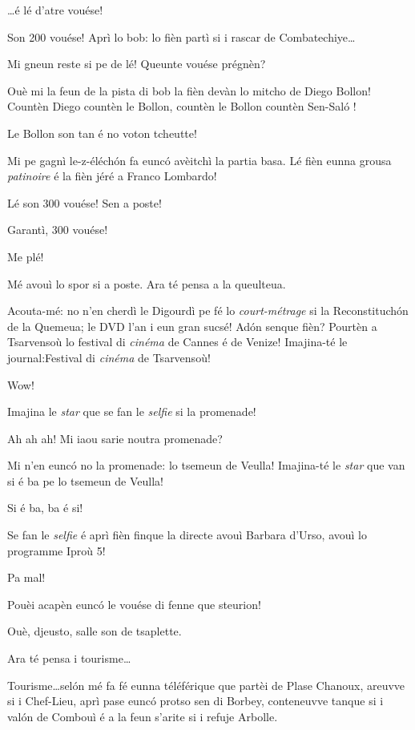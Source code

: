 \begin{drama}
\Ronnyspeaks \ldots é lé d'atre vouése!

\Laurentspeaks Son 200 vouése! Aprì lo bob: lo fièn partì si i rascar de Combatechiye\ldots

\Ronnyspeaks Mi gneun reste si pe de lé! Queunte vouése prégnèn?

\Laurentspeaks Ouè mi la feun de la pista di bob la fièn devàn lo mitcho de Diego Bollon! Countèn Diego countèn le Bollon, countèn le Bollon countèn Sen-Sal\'o !

\Ronnyspeaks Le Bollon son tan é no voton tcheutte!

\Laurentspeaks Mi pe gagnì le-z-éléch\'on fa euncó avèitchì la partia basa. Lé fièn eunna grousa \textit{patinoire} é la fièn jéré a Franco Lombardo!

\Ronnyspeaks Lé son 300 vouése! Sen a poste! 

\Laurentspeaks Garantì,  300 vouése!

\Ronnyspeaks Me plé!

\Laurentspeaks Mé avouì lo spor si a poste. Ara té pensa a la queulteua.

\Ronnyspeaks Acouta-mé: no n'en cherdì le Digourdì pe fé lo \textit{court-métrage} si la Reconstituch\'on de la Quemeua; le DVD l'an i eun gran sucsé! Ad\'on senque fièn? Pourtèn a Tsarvensoù lo festival di \textit{cinéma} de Cannes é de Venize! Imajina-té le journal:\fg Festival di \textit{cinéma} de Tsarvensoù\og{}!

\Laurentspeaks Wow!

\Ronnyspeaks Imajina le \textit{star} que se fan le \textit{selfie} si la promenade!

\Laurentspeaks Ah ah ah! Mi iaou sarie noutra promenade?

\Ronnyspeaks Mi n'en euncó no la promenade: lo tsemeun de Veulla! Imajina-té le \textit{star} que van si é ba pe lo tsemeun de Veulla!

\Laurentspeaks Si é ba, ba é si!

\Ronnyspeaks Se fan le \textit{selfie} é aprì fièn finque la directe avouì Barbara d'Urso, avouì lo programme \og Iproù 5\fg{}!

\Laurentspeaks Pa mal!

\Ronnyspeaks Pouèi acapèn euncó le vouése di fenne que steurion!

\Laurentspeaks Ouè, djeusto, salle son de tsaplette.

\Ronnyspeaks Ara té pensa i tourisme\ldots

\Laurentspeaks Tourisme\ldots sel\'on mé fa fé eunna téléférique que partèi de Plase Chanoux, areuvve si i Chef-Lieu, aprì pase euncó protso sen di Borbey, conteneuvve tanque si i val\'on de Combouì é a la feun s'arite si i refuje Arbolle.


\end{drama}
